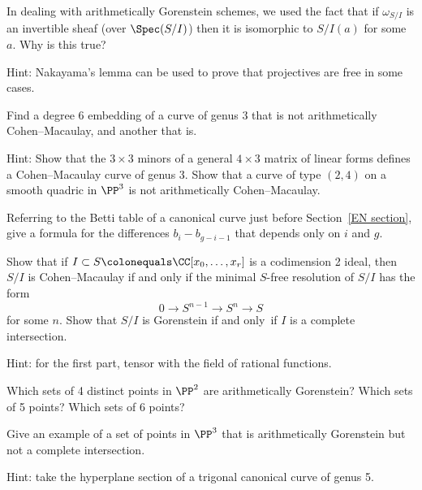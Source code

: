\begin{exercise}
In dealing with arithmetically Gorenstein schemes, we used the fact that
%
if $\omega_{S/I}$ is an invertible
sheaf (over $\Spec(S/I)$) then it is isomorphic to $S/I(a)$ for some
$a$. Why is this true?

Hint: Nakayama's lemma can be used to prove that projectives are free
%
in some cases.
\end{exercise}

\begin{exercise}
Find a degree 6 embedding of a curve of genus 3 that is not arithmetically
Cohen--Macaulay, and another that is.

Hint: Show that the $3\times 3$ minors of a general $4\times 3$ matrix
of linear forms defines a Cohen--Macaulay curve
of genus 3. Show that a curve of type $(2,4)$ on a smooth quadric in
$\PP^3$ is not arithmetically Cohen--Macaulay.
\end{exercise}

\begin{exercise}
Referring to the Betti table of a canonical curve just before
%
Section~\ref{EN section}, give a formula
for the differences $b_i- b_{g-i-1}$ that depends only on $i$ and $g$.
\end{exercise}

\begin{exercise}
Show that if $I \subset S \colonequals  \CC[x_0,\dots, x_r]$ is a
codimension 2 ideal, then $S/I$ is Cohen--Macaulay if and only
if the minimal $S$-free resolution of $S/I$ has the form
$$
0\to S^{n-1} \to S^n \to S
$$
for some $n$. Show that $S/I$ is Gorenstein if and only~if $I$ is a
complete intersection.

Hint: for the first part, tensor with
the field of rational functions.
\end{exercise}

\begin{exercise}
Which sets of 4 distinct points in $\PP^2$ are arithmetically
Gorenstein? Which sets of 5 points? Which sets of 6 points?
\end{exercise}

\begin{exercise}
Give an example of a set of points in $\PP^3$ that is arithmetically
Gorenstein but not a complete intersection.

Hint: take the
hyperplane section of a trigonal canonical curve of genus 5.
\end{exercise}

